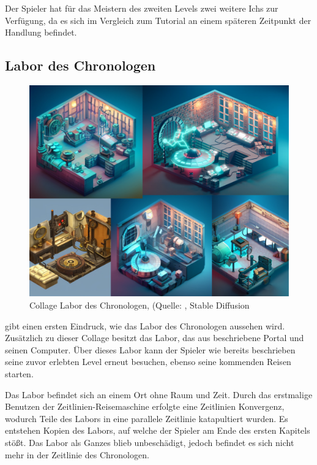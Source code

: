 Der Spieler hat für das Meistern des zweiten Levels zwei weitere Ichs zur Verfügung, da es sich im Vergleich zum Tutorial an einem späteren Zeitpunkt der Handlung befindet. 

\subsection{Labor des Chronologen}

\begin{figure}[ht]
\centering
\includegraphics[width=1\linewidth]{content/pictures/Collage Labor Chronologist.jpg}
\caption{Collage Labor des Chronologen, (Quelle: \cite{cg_plane_dribbble_nodate}, Stable Diffusion}
\label{fig:collage_labor_chron}
\end{figure}

 gibt einen ersten Eindruck, wie das Labor des Chronologen aussehen wird. Zusätzlich zu dieser Collage besitzt das Labor, das aus  beschriebene Portal und seinen Computer. Über dieses Labor kann der Spieler wie bereits beschrieben seine zuvor erlebten Level erneut besuchen, ebenso seine kommenden Reisen starten.

Das Labor befindet sich an einem Ort ohne Raum und Zeit. Durch das erstmalige Benutzen der Zeitlinien-Reisemaschine erfolgte eine Zeitlinien Konvergenz, wodurch Teile des Labors in eine parallele Zeitlinie katapultiert wurden. Es entstehen Kopien des Labors, auf welche der Spieler am Ende des ersten Kapitels stößt. Das Labor als Ganzes blieb unbeschädigt, jedoch befindet es sich nicht mehr in der Zeitlinie des Chronologen.

